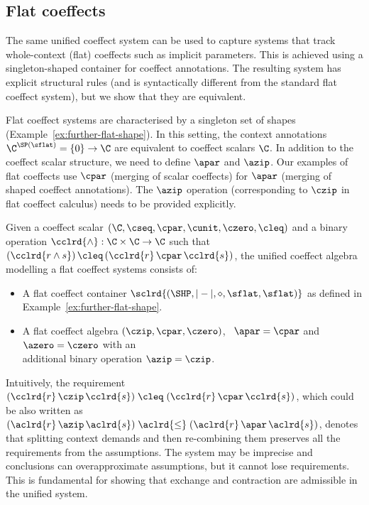 
\subsection{Flat coeffects}
\label{sec:further-flat}

The same unified coeffect system can be used to capture systems that track whole-context (flat)
coeffects such as implicit parameters. This is achieved using a singleton-shaped container for
coeffect annotations. The resulting system has explicit structural rules (and is syntactically
different from the standard flat coeffect system), but we show that they are equivalent.

Flat coeffect systems are characterised by a singleton set of shapes (Example~\ref{ex:further-flat-shape}).
In this setting, the context annotations $\C^{ \SP(\sflat) } = \{0\} \rightarrow \C$ are equivalent
to coeffect scalars $\C$. In addition to the coeffect scalar structure, we need to define $\apar$
and $\azip$. Our examples of flat coeffects use $\cpar$ (merging of scalar coeffects) for $\apar$
(merging of shaped coeffect annotations). The $\azip$ operation (corresponding to $\czip$
in flat coeffect calculus) needs to be provided explicitly.

\begin{definition}
\label{def:further-flat}
Given a coeffect scalar $(\C, \cseq, \cpar, \cunit, \czero, \cleq)$ and a binary operation
$\cclrd{\wedge} : \C \times \C \rightarrow \C$ such that $(\cclrd{r \wedge s}) \,\cleq\, (\cclrd{r}\,\cpar\,\cclrd{s})$,
the unified coeffect algebra modelling a flat coeffect systems consists of:
%
\begin{itemize}{}
\item A flat coeffect container $\sclrd{(\SHP, {|}-{|}, \diamond, \sflat, \sflat)}$ as defined in
  Example~\ref{ex:further-flat-shape}.

\item A flat coeffect algebra $(\czip, \cpar, \czero)$, \ie~$\apar = \cpar$
  and $\azero = \czero$ with an\\ additional binary operation $\azip = \czip$.
\end{itemize}
\end{definition}

\noindent
Intuitively, the requirement $(\cclrd{r}\,\czip\,\cclrd{s}) \;\cleq\; (\cclrd{r}\,\cpar\,\cclrd{s})$,
which could be also written as $(\aclrd{r}\,\azip\,\aclrd{s}) \;\aclrd{\leq}\; (\aclrd{r}\,\apar\,\aclrd{s})$,
denotes that splitting context demands and then re-combining them preserves all the requirements
from the assumptions. The system may be imprecise and conclusions can overapproximate assumptions, but
it cannot lose requirements. This is fundamental for showing that exchange and contraction are admissible
in the unified system.

